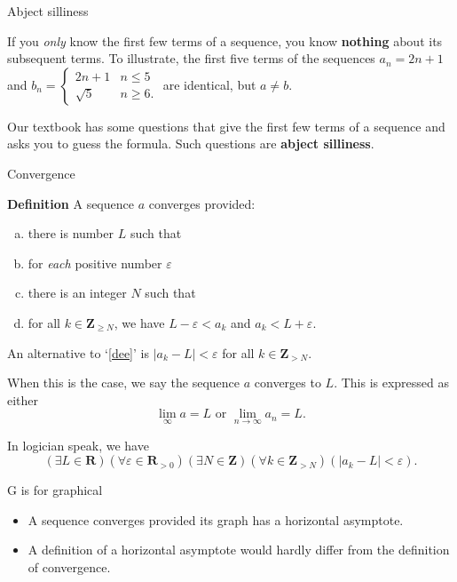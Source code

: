 \documentclass[portrait,fleqn,12pt]{beamer}
\newcommand{\reals}{\mathbf{R}}
\newenvironment{alphalist}
   {\begin{enumerate}[(a)]
       \addtolength{\itemsep}{0.0\itemsep}}
     {\end{enumerate}}
\newcommand{\integers}{\mathbf{Z}}
\newenvironment{define}[1]{
  \textbf{Definition} #1}{}
\begin{document}
\begin{frame}{Abject silliness}

If you \emph{only} know the first few terms of a sequence, you know
\textbf{nothing} about its subsequent terms. To illustrate, the first five
terms of the sequences
\(
  a_n = 2 n + 1
\)
and
\(
  b_n = \begin{cases} 2 n +1 & n \leq 5 \\  \sqrt{5} & n \geq 6. \end{cases}
\)
are identical, but \(a \neq b\). 

Our textbook has some questions that give the first few terms of a sequence and
asks you to guess the formula. Such questions are \textbf{abject silliness}.

\end{frame}
\begin{frame}{Convergence}

\begin{define} A sequence \(a\) converges provided:
\begin{alphalist}
\item there is number \(L\) such that
\item for \emph{each} positive number \(\varepsilon\) 
\item there is an  integer \(N\) such that
\item \label{dee} for all \(k \in \integers_{\geq N}\), we have
\(L  - \varepsilon < a_k\) and \(a_k < L + \varepsilon\).
\end{alphalist}
 An alternative to `\ref{dee}' is \(|a_k - L | < \varepsilon\)
for all \(k \in \integers_{> N}\).

When this is the case, we say the sequence \(a\) converges to
\(L\). This is expressed as either
\[
  \lim_{\infty} a = L \mbox{ or } \lim_{n \to \infty} a_n = L.
\]
\end{define}

In logician speak, we have
\begin{equation*}
\left(\exists L \in \reals\right) 
\left(\forall \varepsilon \in \reals_{>0}\right)
\left(\exists N \in \integers\right)
\left(\forall k \in \integers_{>N}\right)
\left(|a_k - L | <  \varepsilon \right).
\end{equation*}
\end{frame}

\begin{frame}{G is for graphical}

\begin{itemize}

\item A sequence converges provided its graph has a horizontal asymptote.

\item A  definition of a horizontal asymptote 
would hardly differ from the definition of convergence.

\end{itemize}

\end{frame}
\end{document}
